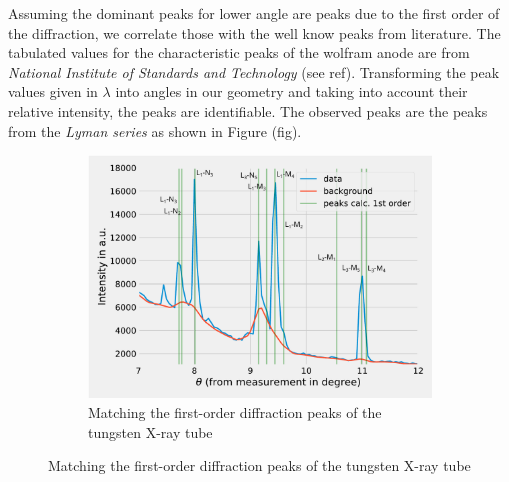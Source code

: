 Assuming the dominant peaks for lower angle are peaks due to the first order of the diffraction, we correlate those with the well know peaks from literature. The tabulated values for the characteristic peaks of the wolfram anode are from \textit{National Institute of Standards and Technology} (see ref).
Transforming the peak values given in $\lambda$ into angles in our geometry and taking into account their relative intensity, the peaks are identifiable.
The observed peaks are the peaks from the \textit{Lyman series} as shown in Figure (fig).
\begin{figure}
    \centering
    \begin{subfigure}[b]{0.85\textwidth}
        \includegraphics[width =\textwidth]{Programming/Absorption/MatchLine1Edit.pdf}      
        \caption{Matching the first-order diffraction peaks of the tungsten X-ray tube}
      \label{fig:MatchLine1}
    \end{subfigure}
    \vspace{0.3cm}


\end{figure}
